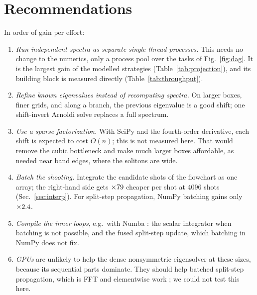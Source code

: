 \documentclass[pre,twocolumn,superscriptaddress,longbibliography]{revtex4-2}
\begin{document}
\begin{table}[t]
\caption{\label{tab:projection}Wall time of the 15-row convergence study predicted by the cost
model for four execution strategies, and the measured production run.}
\footnotesize

\end{table}

\section{Recommendations}\label{sec:recommend}
In order of gain per effort:
\begin{enumerate}
\item \emph{Run independent spectra as separate single-thread processes.} This needs no change to
the numerics, only a process pool over the tasks of Fig.~\ref{fig:dag}. It is the largest gain of
the modelled strategies (Table~\ref{tab:projection}), and its building block is measured directly
(Table~\ref{tab:throughput}).
\item \emph{Refine known eigenvalues instead of recomputing spectra.} On larger boxes, finer grids,
and along a branch, the previous eigenvalue is a good shift; one shift-invert Arnoldi solve
replaces a full spectrum.
\item \emph{Use a sparse factorization.} With SciPy and the fourth-order derivative, each shift is
expected to cost $O(n)$; this is not measured here. That would remove the cubic bottleneck and make
much larger boxes affordable, as needed near band edges, where the solitons are wide.
\item \emph{Batch the shooting.} Integrate the candidate shots of the flowchart as one array; the
right-hand side gets $\times79$ cheaper per shot at 4096 shots (Sec.~\ref{sec:interp}). For
split-step propagation, NumPy batching gains only $\times2.4$.
\item \emph{Compile the inner loops}, e.g.\ with Numba \cite{Numba2015}: the scalar integrator
when batching is not possible, and the fused split-step update, which batching in NumPy does not
fix.
\item \emph{GPUs} are unlikely to help the dense nonsymmetric eigensolver at these sizes, because
its sequential parts dominate. They should help batched split-step propagation, which is FFT and
elementwise work \cite{FFTW2005}; we could not test this here.
\end{enumerate}
\end{document}
